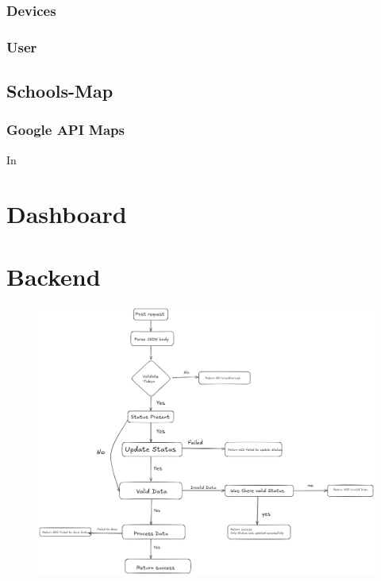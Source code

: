 \begin{inhalt}
\subsubsection{Devices}

\subsubsection{User}

\subsection{Schools-Map}

\subsubsection{Google API Maps}

In

\newpage

\section{Dashboard}




\newpage

\section{Backend}





\begin{figure}[!htb]
\centering
\includegraphics[width=1\textwidth]{files/Thomas/pics/Website/backend/image.png}
\caption[Bildbezeichnung für Abbildungsverzeichnis]{}
\label{fig:gehaeuse_internet_bild}
\end{figure}

\clearpage





\end{inhalt}